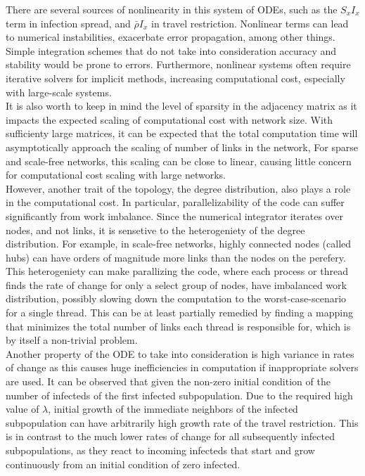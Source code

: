 There are several sources of nonlinearity in this system of ODEs, such as the $S_{x} I_{x}$ term in infection spread, and $\bar \rho I_{x}$ in travel restriction. Nonlinear terms can lead to numerical instabilities, exacerbate error propagation, among other things. Simple integration schemes that do not take into consideration accuracy and stability would be prone to errors. Furthermore, nonlinear systems often require iterative solvers for implicit methods, increasing computational cost, especially with large-scale systems.\\

It is also worth to keep in mind the level of sparsity in the adjacency matrix as it impacts the expected scaling of computational cost with network size. With sufficienty large matrices, it can be expected that the total computation time will asymptotically approach the scaling of number of links in the network, For sparse and scale-free networks, this scaling can be close to linear, causing little concern for computational cost scaling with large networks.\\

However, another trait of the topology, the degree distribution, also plays a role in the computational cost. In particular, parallelizability of the code can suffer significantly from work imbalance. Since the numerical integrator iterates over nodes, and not links, it is sensetive to the heterogeniety of the degree distribution. For example, in scale-free networks, highly connected nodes (called hubs) can have orders of magnitude more links than the nodes on the perefery. This heterogeniety can make parallizing the code, where each process or thread finds the rate of change for only a select group of nodes, have imbalanced work distribution, possibly slowing down the computation to the worst-case-scenario for a single thread. This can be at least partially remedied by finding a mapping that minimizes the total number of links each thread is responsible for, which is by itself a non-trivial problem.\\

Another property of the ODE to take into consideration is high variance in rates of change as this causes huge inefficiencies in computation if inappropriate solvers are used. It can be observed that given the non-zero initial condition of the number of infecteds of the first infected subpopulation. Due to the required high value of $\lambda$, initial growth of the immediate neighbors of the infected subpopulation can have arbitrarily high growth rate of the travel restriction. This is in contrast to the much lower rates of change for all subsequently infected subpopulations, as they react to incoming infecteds that start and grow continuously from an initial condition of zero infected.\\



